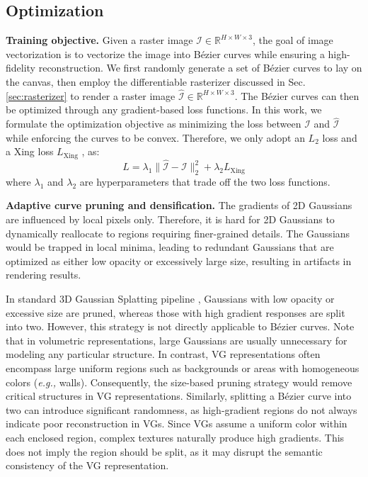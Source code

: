 \vspace{-.5em}
\subsection{Optimization}
\vspace{-.5em}
\label{sec:optimization}

\noindent\textbf{Training objective.}
Given a raster image $\mathcal{I} \in \mathbb{R}^{H \times W \times 3}$, the goal of image vectorization is to vectorize the image into Bézier curves while ensuring a high-fidelity reconstruction. We first randomly generate a set of Bézier curves to lay on the canvas, then employ the differentiable rasterizer discussed in Sec. \ref{sec:rasterizer} to render a raster image $\hat{\mathcal{I}} \in \mathbb{R}^{H \times W \times 3}$. The Bézier curves can then be optimized through any gradient-based loss functions. 
In this work, we formulate the optimization objective as minimizing the loss between  $\mathcal{I}$ and $\hat{\mathcal{I}}$ while enforcing the curves to be convex. Therefore, we only adopt an $L_2$ loss and a Xing loss $L_{\text{Xing}}$  \cite{xu2022live}, as:
\begin{equation}
L = \lambda_1 \|\hat{\mathcal{I}} - \mathcal{I} \|_2^2 +  \lambda_2 L_{\text{Xing}}
\end{equation}
where $\lambda_1$ and $\lambda_2$ are hyperparameters that trade off the two loss functions.



\noindent\textbf{Adaptive curve pruning and densification.}
The gradients of 2D Gaussians are influenced by local pixels only. Therefore, it is hard for 2D Gaussians to dynamically reallocate to regions requiring finer-grained details. The Gaussians would be trapped in local minima, leading to redundant Gaussians that are optimized as either low opacity or excessively large size, resulting in artifacts in rendering results. 

In standard 3D Gaussian Splatting pipeline \cite{kerbl3Dgaussians}, Gaussians with low opacity or excessive size are pruned, whereas those with high gradient responses are split into two. However, this strategy is not directly applicable to Bézier curves. Note that in volumetric representations, large Gaussians are usually unnecessary for modeling any particular structure. In contrast, VG representations often encompass large uniform regions such as backgrounds or areas with homogeneous colors (\textit{e.g.,} walls). Consequently, the size-based pruning strategy would remove critical structures in VG representations. Similarly, splitting a Bézier curve into two can introduce significant randomness, as high-gradient regions do not always indicate poor reconstruction in VGs. Since VGs assume a uniform color within each enclosed region, complex textures naturally produce high gradients. This does not imply the region should be split, as it may disrupt the semantic consistency of the VG representation.



